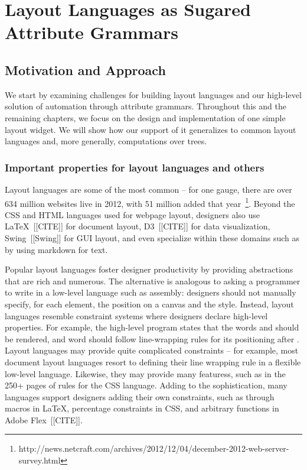 \chapter{Layout Languages as Sugared Attribute Grammars}
\section{Motivation and Approach}

We start by examining challenges for building layout languages and our high-level solution of automation through attribute grammars.  Throughout this and the remaining chapters, we focus on the design and implementation of one simple layout widget. We will show how our support of it generalizes to common layout languages and, more generally, computations over trees.

\subsection{Important properties for layout languages and others}
Layout languages are some of the most common -- for one gauge, there are over 634 million websites live in 2012, with 51 million added that year~\footnote{http://news.netcraft.com/archives/2012/12/04/december-2012-web-server-survey.html}. Beyond the CSS and HTML languages used for webpage layout, designers also use \LaTeX~[[CITE]] for document layout, D3~[[CITE]] for data visualization, Swing~[[Swing]] for GUI layout, and even specialize within these domains such as by using markdown for text. 


Popular layout languages foster designer productivity by providing abstractions that are rich and numerous.
The alternative is analogous to asking a programmer to write in a low-level language such as assembly: designers should not manually specify, for each element, the position on a canvas and the style. Instead, layout languages resemble constraint systems where designers  declare high-level properties. For example, the high-level program  states that the words  and  should be rendered, and word  should follow line-wrapping rules for its positioning after . Layout languages may provide quite complicated constraints -- for example, most document layout languages resort to defining their line wrapping rule  in a flexible low-level language. Likewise, they may provide many featuress, such as in the 250+ pages of rules for the CSS language. Adding to the sophistication, many languages support designers adding their own constraints, such as through macros in \LaTeX,  percentage constraints in CSS, and arbitrary functions in Adobe Flex~[[CITE]]. 


